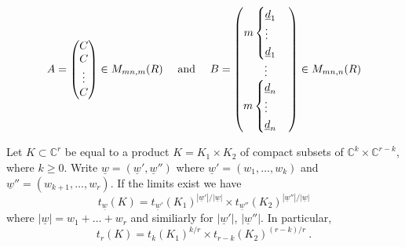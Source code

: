 \documentclass[10pt,a4paper]{amsart}
\newcommand{\C}{\mathbb C}
\begin{document}
 \begin{equation} \label{KroneckerCase} A =  \begin{pmatrix}    C  \\  C  \\  \vdots\\  C \end{pmatrix} \in M_{mn,m}(R)   \quad \hbox{ and } \quad B =   \begin{pmatrix}    m\begin{cases} \underline{d}_1\\ \vdots\\ \underline{d}_1 \end{cases} \\ \vdots \\ m\begin{cases} \underline{d}_n\\ \vdots\\ \underline{d}_n \end{cases}   \\  \end{pmatrix}\in M_{mn,n}(R) 
\end{equation}

\begin{thm}
Let $K\subset \C^r$ be equal to a product $K= K_1\times K_2$ of compact subsets of $\C^{k} \times \C^{r-k}$, where $k\geq 0$. 
Write $\underline{w} = ( \underline{w}', \underline{w}'')$ where 
$\underline{w}' = (w_1,\ldots, w_k)$ and  $ \underline{w}'' = (w_{k+1},\ldots, w_r).$ If the limits exist we have
\[   t_{\underline{w}}(K) = t_{\underline{w}'}(K_1)^{|\underline{w}'|/|\underline{w}|} \times t_{\underline{w}''}(K_2)^{|\underline{w}''|/|\underline{w}|}  \]
 where $|\underline{w}| = w_1+ \ldots+ w_r$ and similiarly for $|\underline{w}'|$, $|\underline{w}''|$. 
In particular, 
\[ t_r(K) = t_k(K_1)^{k/r} \times t_{r-k}(K_2)^{(r-k)/r}  \ . \]
\end{thm}
\end{document}
